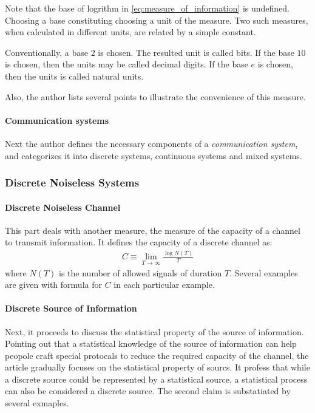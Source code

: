 \documentclass{article}
\numberwithin{equation}{subsection} %
\theoremstyle{definition}
\begin{document}
    Note that the base of logrithm in \ref{eq:measure_of_information}
    is undefined. Choosing a base constituting choosing a unit of
    the measure. Two such measures, when calculated in different units,
    are related by a simple constant.

    Conventionally, a base $2$ is chosen. The resulted unit is called
    bits. If the base $10$ is chosen, then the units may be called
    decimal digits. If the base $e$ is chosen, then the units is
    called natural units.

    Also, the author lists several points to illustrate the
    convenience of this measure.

    \paragraph{Communication systems}
    Next the author defines the necessary components of a \textit{
    communication system}, and categorizes it into discrete systems,
    continuous systems and mixed systems.

    \subsubsection{Discrete Noiseless Systems}

    \paragraph{Discrete Noiseless Channel}
    \label{sec:Discrete Noiseless Channel}
    This part deals with another measure, the measure of the capacity
    of a channel to transmit information. It defines the capacity of a
    discrete channel as:
    \begin{align}
        \label{eq:capacity_of_disc_chan}
        C\equiv \lim_{T\to \infty} \frac{\log N(T)}{T}
    \end{align}
    where $N(T)$ is the number of allowed signals of duration $T$.
    Several examples are given with formula for $C$ in each particular
    example.
    
    \paragraph{Discrete Source of Information}
    Next, it proceeds to discuss the statistical property of the source
    of information. Pointing out that a statistical knowledge of the
    source of information can help peopole craft special protocals to
    reduce the required capacity of the channel, the article gradually
    focuses on the statistical property of sourcs. It profess that while a
    discrete source could be represented by a statistical source, a
    statistical process can also be considered a discrete source. The
    second claim is substatiated by several exmaples.
\end{document}
